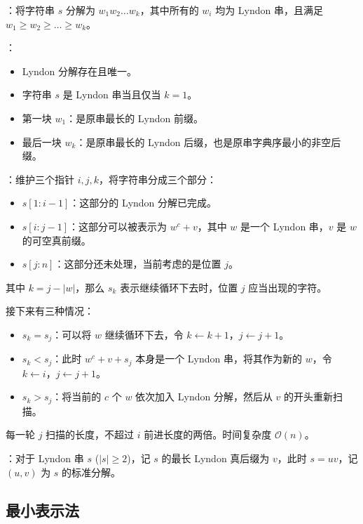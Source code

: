 ：将字符串 $s$ 分解为 $w_1w_2\dots w_k$，其中所有的 $w_i$ 均为 Lyndon 串，且满足 $w_1 \geq w_2 \geq \dots \geq w_k$。

：

\begin{itemize}
    \item Lyndon 分解存在且唯一。
    \item 字符串 $s$ 是 Lyndon 串当且仅当 $k = 1$。
    \item 第一块 $w_1$：是原串最长的 Lyndon 前缀。
    \item 最后一块 $w_k$：是原串最长的 Lyndon 后缀，也是原串字典序最小的非空后缀。
\end{itemize}

：维护三个指针 $i, j, k$，将字符串分成三个部分：
\begin{itemize}
    \item $s[1 : i - 1]$：这部分的 Lyndon 分解已完成。
    \item $s[i : j - 1]$：这部分可以被表示为 $w^c + v$，其中 $w$ 是一个 Lyndon 串，$v$ 是 $w$ 的可空真前缀。
    \item $s[j : n]$：这部分还未处理，当前考虑的是位置 $j$。
\end{itemize}

其中 $k = j - |w|$，那么 $s_k$ 表示继续循环下去时，位置 $j$ 应当出现的字符。

接下来有三种情况：
\begin{itemize}
    \item $s_k = s_j$：可以将 $w$ 继续循环下去，令 $k \gets k + 1$，$j \gets j + 1$。
    \item $s_k < s_j$：此时 $w^c + v + s_j$ 本身是一个 Lyndon 串，将其作为新的 $w$，令 $k \gets i$，$j \gets j + 1$。
    \item $s_k > s_j$：将当前的 $c$ 个 $w$ 依次加入 Lyndon 分解，然后从 $v$ 的开头重新扫描。
\end{itemize}

每一轮 $j$ 扫描的长度，不超过 $i$ 前进长度的两倍。时间复杂度 $\mathcal{O}(n)$。


：对于 Lyndon 串 $s$ ($|s| \geq 2$)，记 $s$ 的最长 Lyndon 真后缀为 $v$，此时 $s = uv$，记 $(u, v)$ 为 $s$ 的标准分解。

\subsection{最小表示法}

